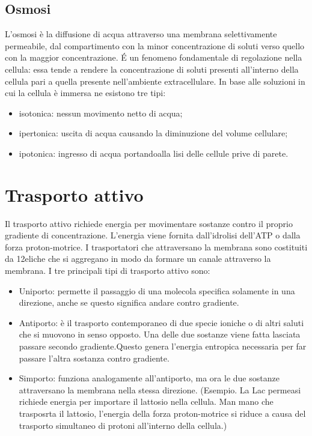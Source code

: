 \subsection{Osmosi}
L'osmosi \`e la diffusione di acqua attraverso una membrana selettivamente permeabile, dal compartimento con la minor concentrazione di soluti verso quello con la maggior concentrazione. \'E un fenomeno fondamentale di regolazione nella cellula: essa tende a rendere la concentrazione di soluti presenti all'interno della cellula pari a quella presente nell'ambiente extracellulare. In base alle soluzioni in cui la cellula \`e immersa ne esistono tre tipi:
\begin{itemize}
    \item isotonica: nessun movimento netto di acqua;
    \item ipertonica: uscita di acqua causando la diminuzione del volume cellulare;
    \item ipotonica: ingresso di acqua portandoalla lisi delle cellule prive di parete.
\end{itemize}
\section{Trasporto attivo}
Il trasporto attivo richiede energia per movimentare sostanze contro il proprio gradiente di concentrazione. L'energia viene fornita dall'idrolisi dell'ATP o dalla forza proton-motrice.
I trasportatori che attraversano la membrana sono costituiti da 12\alphaA eliche che si aggregano in modo da formare un canale attraverso la membrana. 
I tre principali tipi di trasporto attivo sono: 
\begin{itemize}
        \item Uniporto: permette il passaggio di una molecola specifica solamente in una direzione, anche se questo significa andare contro gradiente. 
        \item Antiporto: è il trasporto contemporaneo di due specie ioniche o di altri saluti che si muovono in senso opposto. Una delle due sostanze viene fatta lasciata passare secondo gradiente.Questo genera l'energia entropica necessaria per far passare l'altra sostanza contro gradiente.
        \item Simporto: funziona analogamente all'antiporto, ma ora le due sostanze attraversano la membrana nella stessa direzione. (Esempio. La Lac permeasi richiede energia per importare il lattosio nella cellula. Man mano che trasposrta il lattosio, l'energia della forza proton-motrice si riduce a causa del trasporto simultaneo di protoni all'interno della cellula.)
\end{itemize}
